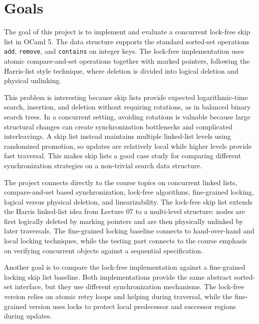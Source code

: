 \documentclass[11pt,a4paper]{article}
\begin{document}
\vspace{30em}

\section{Goals}
\label{sec:goals}

The goal of this project is to implement and evaluate a concurrent lock-free skip list in OCaml 5. The data structure supports the standard sorted-set operations \texttt{add}, \texttt{remove}, and \texttt{contains} on integer keys. The lock-free implementation uses atomic compare-and-set operations together with marked pointers, following the Harris-list style technique, where deletion is divided into logical deletion and physical unlinking.

This problem is interesting because skip lists provide expected logarithmic-time search, insertion, and deletion without requiring rotations, as in balanced binary search trees. In a concurrent setting, avoiding rotations is valuable because large structural changes can create synchronization bottlenecks and complicated interleavings. A skip list instead maintains multiple linked-list levels using randomized promotion, so updates are relatively local while higher levels provide fast traversal. This makes skip lists a good case study for comparing different synchronization strategies on a non-trivial search data structure.

The project connects directly to the course topics on concurrent linked lists, compare-and-set based synchronization, lock-free algorithms, fine-grained locking, logical versus physical deletion, and linearizability. The lock-free skip list extends the Harris linked-list idea from Lecture 07 to a multi-level structure: nodes are first logically deleted by marking pointers and are then physically unlinked by later traversals. The fine-grained locking baseline connects to hand-over-hand and local locking techniques, while the testing part connects to the course emphasis on verifying concurrent objects against a sequential specification.

Another goal is to compare the lock-free implementation against a fine-grained locking skip list baseline. Both implementations provide the same abstract sorted-set interface, but they use different synchronization mechanisms. The lock-free version relies on atomic retry loops and helping during traversal, while the fine-grained version uses locks to protect local predecessor and successor regions during updates.
\end{document}
